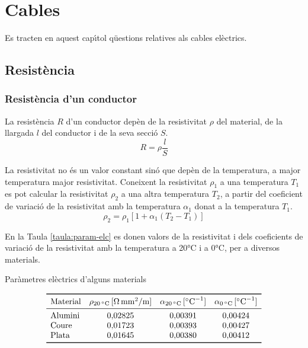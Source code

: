 \chapter{Cables}

Es tracten en aquest cap\'{\i}tol q\"{u}estions relatives als cables el\`{e}ctrics.

\section{Resist\`{e}ncia}

\subsection{Resist\`{e}ncia d'un conductor}

La resist\`{e}ncia $R$ d'un conductor dep\`{e}n de la resistivitat $\rho$
del material, de la llargada $l$ del conductor i de la seva secci\'{o}
$S$.
\begin{equation}
   R= \rho \frac{l}{S}
\end{equation}
\index{$\rho$}

La resistivitat no
\'{e}s un valor constant sin\'{o} que dep\`{e}n de la temperatura, a major
temperatura major resistivitat. Coneixent la resistivitat $\rho_1$ a una
temperatura $T_1$ es pot calcular la resistivitat $\rho_2$ a una altra
temperatura $T_2$, a partir del coeficient de variaci\'{o} de la
resistivitat amb la temperatura $\alpha_1$ donat a la temperatura $T_1$.
\begin{equation}
   \rho_2 = \rho_1 [1 + \alpha_1 (T_2 - T_1)]\label{eq:resistivitat}
\end{equation}
\index{$\alpha$}

En la Taula
\vref{taula:param-elc} es donen valors de la resistivitat i dels
coeficients de variaci\'{o} de la resistivitat amb la temperatura a
20\unit{\celsius} i a 0\unit{\celsius}, per a diversos materials.
\begin{table}[htb]
   \caption{\label{taula:param-elc} Par\`{a}metres el\`{e}ctrics d'alguns materials}
   \[ \begin{array}{lccc}
   \toprule[1pt]
   \text{Material} & \rho_{20\unit{\celsius}}\unit{[\ohm\,mm^2/m]} & \alpha_{20\unit{\celsius}}\unit{[\celsius^{-1}]} &
   \alpha_{0\unit{\celsius}}\unit{[\celsius^{-1}]}
   \\
   \midrule
      \text{Alumini} & 0{,}02825 & 0{,}00391 & 0{,}00424 \\
      \text{Coure}   & 0{,}01723 & 0{,}00393 & 0{,}00427 \\
      \text{Plata}   & 0{,}01645 & 0{,}00380 & 0{,}00412 \\
   \bottomrule[1pt]
   \end{array}   \]
\end{table}

